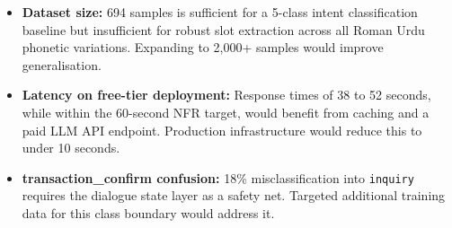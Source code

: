 \begin{itemize}
  \item \textbf{Dataset size:} 694 samples is sufficient for a 5-class intent
        classification baseline but insufficient for robust slot extraction across all
        Roman Urdu phonetic variations.  Expanding to 2,000+ samples would improve
        generalisation.

  \item \textbf{Latency on free-tier deployment:} Response times of 38 to 52 seconds,
        while within the 60-second NFR target, would benefit from caching and a paid
        LLM API endpoint.  Production infrastructure would reduce this to under 10
        seconds.

  \item \textbf{transaction\_confirm confusion:} 18\% misclassification into
        \texttt{inquiry} requires the dialogue state layer as a safety net.  Targeted
        additional training data for this class boundary would address it.

\end{itemize}

